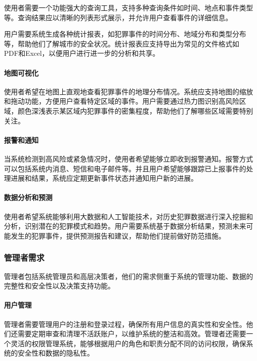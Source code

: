 使用者需要一个功能强大的查询工具，支持多种查询条件如时间、地点和事件类型等。查询结果应以清晰的列表形式展示，并允许用户查看事件的详细信息。

用户需要系统生成各种统计报表，如犯罪事件的时间分布、地域分布和类型分布等，帮助他们了解城市的安全状况。统计报表应支持导出为常见的文件格式如PDF和Excel，以便用户进行进一步的分析和共享。

\paragraph{地图可视化}

使用者希望在地图上直观地查看犯罪事件的地理分布情况。系统应支持地图的缩放和拖动功能，方便用户查看特定区域的事件。用户需要通过热力图识别高风险区域，颜色深浅表示某区域内犯罪事件的密集程度，帮助他们了解哪些区域需要特别关注。

\paragraph{报警和通知}

当系统检测到高风险或紧急情况时，使用者希望能够立即收到报警通知。报警方式可以包括系统内消息、短信和电子邮件等。并且用户希望能够跟踪已上报事件的处理进展和结果，系统应定期更新事件状态并通知用户新的进展。

\paragraph{数据分析和预测}

使用者希望系统能够利用大数据和人工智能技术，对历史犯罪数据进行深入挖掘和分析，识别潜在的犯罪模式和趋势。用户需要系统基于数据分析结果，预测未来可能发生的犯罪事件，提供预测报告和建议，帮助他们提前做好防范措施。

\subsubsection{管理者需求}

管理者包括系统管理员和高层决策者，他们的需求侧重于系统的管理功能、数据的完整性和安全性以及决策支持功能。

\paragraph{用户管理}

管理者需要管理用户的注册和登录过程，确保所有用户信息的真实性和安全性。他们还需要定期审查和清理不活跃账户，以维护系统的整洁和高效。管理者还需要一个灵活的权限管理系统，能够根据用户的角色和职责分配不同的访问权限，确保系统的安全性和数据的隐私性。

